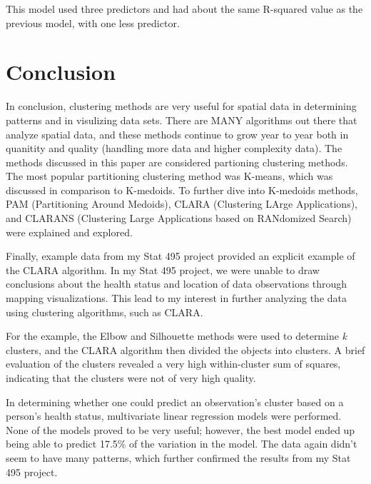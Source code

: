 \documentclass[12pt,twoside]{amherstthesis}
\begin{document}
  This model used three predictors and had about the same R-squared value
  as the previous model, with one less predictor.
  
  \chapter*{Conclusion}\label{conclusion}
  
  \setcounter{chapter}{4} \setcounter{section}{0}
  
  In conclusion, clustering methods are very useful for spatial data in
  determining patterns and in visulizing data sets. There are MANY
  algorithms out there that analyze spatial data, and these methods
  continue to grow year to year both in quanitity and quality (handling
  more data and higher complexity data). The methods discussed in this
  paper are considered partioning clustering methods. The most popular
  partitioning clustering method was K-means, which was discussed in
  comparison to K-medoids. To further dive into K-medoids methods, PAM
  (Partitioning Around Medoids), CLARA (Clustering LArge Applications),
  and CLARANS (Clustering Large Applications based on RANdomized Search)
  were explained and explored.
  
  Finally, example data from my Stat 495 project provided an explicit
  example of the CLARA algorithm. In my Stat 495 project, we were unable
  to draw conclusions about the health status and location of data
  observations through mapping visualizations. This lead to my interest in
  further analyzing the data using clustering algorithms, such as CLARA.
  
  For the example, the Elbow and Silhouette methods were used to determine
  \emph{k} clusters, and the CLARA algorithm then divided the objects into
  clusters. A brief evaluation of the clusters revealed a very high
  within-cluster sum of squares, indicating that the clusters were not of
  very high quality.
  
  In determining whether one could predict an observation's cluster based
  on a person's health status, multivariate linear regression models were
  performed. None of the models proved to be very useful; however, the
  best model ended up being able to predict 17.5\% of the variation in the
  model. The data again didn't seem to have many patterns, which further
  confirmed the results from my Stat 495 project.
  
  \appendix
  
\end{document}
